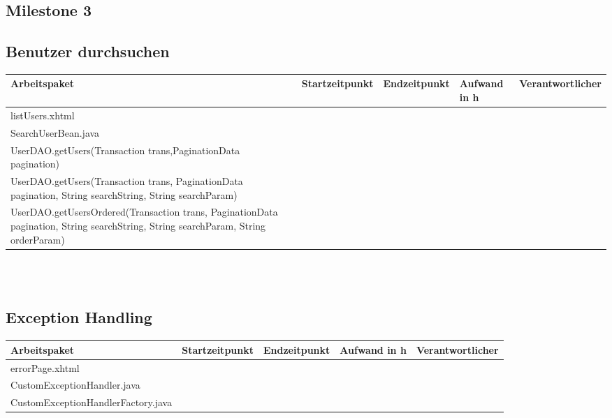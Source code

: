 \begin{landscape}
	\section{Milestone 3}	
	
	\subsection{Benutzer durchsuchen}
	\begin{tabular}{|p{10cm}|p{4cm}|p{3cm}|p{3cm}|p{3cm}|}
		\hline  \textbf{Arbeitspaket} & \textbf{Startzeitpunkt} & \textbf{Endzeitpunkt} & \textbf{Aufwand in h} & \textbf{Verantwortlicher} \\ 
		\hline   listUsers.xhtml                                              &                            &                             &                     &\\
		\hline   SearchUserBean.java                                          &                            &                             &                     &\\
		\hline   UserDAO.getUsers(Transaction trans,PaginationData pagination)&                            &                             &                     &\\
		\hline   UserDAO.getUsers(Transaction trans, PaginationData pagination, String searchString, String searchParam)&                            &                             &                     &\\ 
		\hline   UserDAO.getUsersOrdered(Transaction trans, PaginationData pagination, String searchString, String searchParam, String orderParam)   &                            &                             &                     &\\                                 
		\hline 
	\end{tabular} \ \\
	\ \\
	
	\subsection{Exception Handling}
	\begin{tabular}{|p{10cm}|p{4cm}|p{3cm}|p{3cm}|p{3cm}|}
		\hline  \textbf{Arbeitspaket} & \textbf{Startzeitpunkt} & \textbf{Endzeitpunkt} & \textbf{Aufwand in h} & \textbf{Verantwortlicher} \\ 
		\hline   errorPage.xhtml                                       &                            &                             &                     &\\
		\hline   CustomExceptionHandler.java                           &                            &                             &                     &\\
		\hline   CustomExceptionHandlerFactory.java                    &                            &                             &                     &\\
		\hline 
	\end{tabular} \ \\
	\ \\	
	

\end{landscape}

